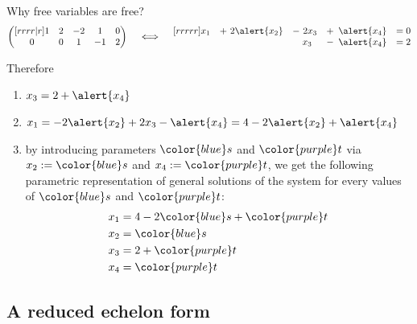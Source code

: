 \documentclass%
[handout]%
{beamer}
\newcommand\purple[1]{{\color{purple} #1}}
\newcommand\blue[1]{{\color{blue} #1}}
\begin{document}
\begin{frame}[label=free]{Why free variables are free?}
\[
\begin{pmatrix}[rrrr|r]
      1  &  2   &  -2  &   1   & 0 \\
      0  &  0   &   1  &  -1   & 2
\end{pmatrix}
    \quad
    \iff
    \quad
\begin{matrix}[rrrrr]
    x_1 &+\ 2\alert{x_2}& -\ 2x_3& +\hphantom{2}\alert{x_4} &=0 \\
        &  &  \hphantom{2}x_3 & - \hphantom{2}\alert{x_4} &=2
\end{matrix}
\]

Therefore
\begin{enumerate}
  \item $x_3 = 2 + \alert{x_4}$
  \item $x_1 = - 2 \alert{x_2} + 2x_3-\alert{x_4}
            =  4 - 2 \alert{x_2} + \alert{x_4} $
  \item by introducing \alert{parameters} $\blue{s}$ and $\purple{t}$ via $x_2:=\blue{s}$ and $x_4:= \purple{t}$, we get the following \alert{parametric representation} of general solutions of the system for every values of $\blue{s}$ and $\purple{t}$:
  \begin{align*}
      x_1 & = 4 - 2\blue{s} + \purple{t}\\
      x_2 & = \blue{s} \\
      x_3 & = 2 + \purple{t}\\
      x_4 & = \purple{t}
  \end{align*}
\end{enumerate}

\end{frame}

\subsection{A reduced echelon form}
\end{document}
